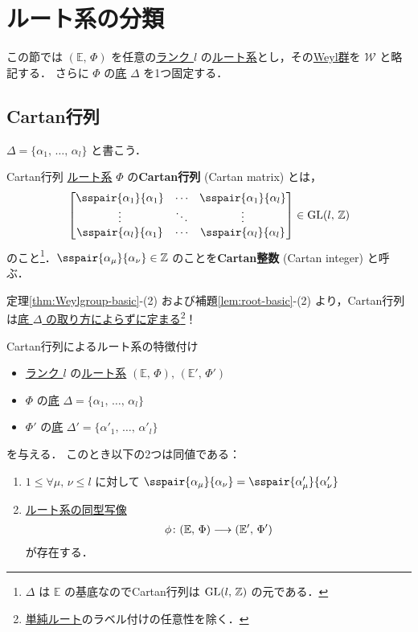 \documentclass[rep_main]{subfiles}
\begin{document}
\section{ルート系の分類}

この節では $(\mathbb{E},\, \Phi)$ を任意の\hyperref[def:rank-root]{ランク $l$} の\hyperref[ax:root-system]{ルート系}とし，その\hyperref[def:Weylgroup]{Weyl群}を $\mathscr{W}$ と略記する． 
さらに $\Phi$ の\hyperref[def:base-root]{底} $\Delta$ を1つ固定する．

\subsection{Cartan行列}

$\Delta = \{\alpha_1,\, \dots,\, \alpha_l\}$ と書こう．

\begin{mydef}[label=def:Cartan-matrix]{Cartan行列}
	\hyperref[ax:root-system]{ルート系} $\Phi$ の\textbf{Cartan行列} (Cartan matrix) とは，
	\begin{align}
		\mqty[\sspair{\alpha_1}{\alpha_1} &\cdots &\sspair{\alpha_1}{\alpha_l} \\ \vdots &\ddots &\vdots \\ \sspair{\alpha_l}{\alpha_1} &\cdots & \sspair{\alpha_l}{\alpha_l}] \in \LGL(l,\, \mathbb{Z})
	\end{align}
	のこと\footnote{$\Delta$ は $\mathbb{E}$ の基底なのでCartan行列は $\mathrm{GL}(l,\, \mathbb{Z})$ の元である．}．$\sspair{\alpha_\mu}{\alpha_\nu} \in \mathbb{Z}$ のことを\textbf{Cartan整数} (Cartan integer) と呼ぶ．
\end{mydef}

定理\ref{thm:Weylgroup-basic}-(2) および補題\ref{lem:root-basic}-(2) より，Cartan行列は\underline{底 $\Delta$ の取り方によらずに定まる}\footnote{\hyperref[def:base-root]{単純ルート}のラベル付けの任意性を除く．}！

\begin{myprop}[label=prop:Cartan-matrix-basic]{Cartan行列によるルート系の特徴付け}
	\begin{itemize}
		\item \hyperref[def:rank-root]{ランク $l$} の\hyperref[ax:root-system]{ルート系} $(\mathbb{E},\, \Phi),\, (\mathbb{E}',\, \Phi')$ 
		\item $\Phi$ の\hyperref[def:base-root]{底} $\Delta = \{\alpha_1,\, \dots,\, \alpha_l\}$
		\item $\Phi'$ の\hyperref[def:base-root]{底} $\Delta' = \{\alpha'_1,\, \dots,\, \alpha'_l\}$
	\end{itemize}
	を与える．
	このとき以下の2つは同値である：
	\begin{enumerate}
		\item $1 \le \forall \mu,\, \nu \le l$ に対して $\sspair{\alpha_\mu}{\alpha_\nu} = \sspair{\alpha'_\mu}{\alpha'_\nu}$
		\item \hyperref[def:isom-root]{ルート系の同型写像}
			\begin{align}
				\phi \colon (\mathbb{E},\, \Phi) \longrightarrow (\mathbb{E}',\, \Phi')
			\end{align}
			が存在する．
	\end{enumerate}
\end{myprop}
\end{document}
